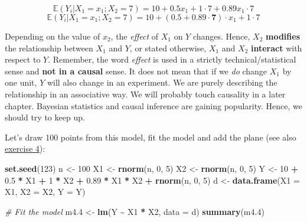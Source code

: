 \documentclass[
]{book}
\newenvironment{Shaded}{\begin{snugshade}}{\end{snugshade}}
\newcommand{\AttributeTok}[1]{\textcolor[rgb]{0.13,0.29,0.53}{#1}}
\newcommand{\CommentTok}[1]{\textcolor[rgb]{0.56,0.35,0.01}{\textit{#1}}}
\newcommand{\DecValTok}[1]{\textcolor[rgb]{0.00,0.00,0.81}{#1}}
\newcommand{\FloatTok}[1]{\textcolor[rgb]{0.00,0.00,0.81}{#1}}
\newcommand{\FunctionTok}[1]{\textcolor[rgb]{0.13,0.29,0.53}{\textbf{#1}}}
\newcommand{\NormalTok}[1]{#1}
\newcommand{\OtherTok}[1]{\textcolor[rgb]{0.56,0.35,0.01}{#1}}
\newcommand{\SpecialCharTok}[1]{\textcolor[rgb]{0.81,0.36,0.00}{\textbf{#1}}}
\begin{document}
\[ \mathbb{E}(Y_i|X_1 = x_1; X_2 = 7) = 10 + 0.5 x_1 + 1 \cdot 7 + 0.89 x_1 \cdot 7\]
\[ \mathbb{E}(Y_i|X_1 = x_1; X_2 = 7) = 10 + (0.5 + 0.89 \cdot \mathbf{7}) \cdot x_1 + 1 \cdot 7\]

Depending on the value of \(x_2\), the \emph{effect} of \(X_1\) on \(Y\) changes.
Hence, \(X_2\) \textbf{modifies} the relationship between \(X_1\) and \(Y\), or stated otherwise,
\(X_1\) and \(X_2\) \textbf{interact} with respect to \(Y\). Remember, the word \emph{effect} is
used in a strictly technical/statistical sense and \textbf{not in a causal} sense.
It does not mean that if we \emph{do} change \(X_1\) by one unit,
\(Y\) will also change in an experiment. We are purely describing the relationship
in an associative way. We will probably touch causality in a later chapter.
Bayesian statistics and causal inference are gaining popularity. Hence, we should try to keep up.

Let's draw 100 points from this model, fit the model and add the plane (see also \hyperref[exercise3_multiple_regression]{exercise 4}):

\begin{Shaded}
\begin{Highlighting}[]
\FunctionTok{set.seed}\NormalTok{(}\DecValTok{123}\NormalTok{)}
\NormalTok{n }\OtherTok{\textless{}{-}} \DecValTok{100}
\NormalTok{X1 }\OtherTok{\textless{}{-}} \FunctionTok{rnorm}\NormalTok{(n, }\DecValTok{0}\NormalTok{, }\DecValTok{5}\NormalTok{)}
\NormalTok{X2 }\OtherTok{\textless{}{-}} \FunctionTok{rnorm}\NormalTok{(n, }\DecValTok{0}\NormalTok{, }\DecValTok{5}\NormalTok{)}
\NormalTok{Y }\OtherTok{\textless{}{-}} \DecValTok{10} \SpecialCharTok{+} \FloatTok{0.5} \SpecialCharTok{*}\NormalTok{ X1 }\SpecialCharTok{+} \DecValTok{1} \SpecialCharTok{*}\NormalTok{ X2 }\SpecialCharTok{+} \FloatTok{0.89} \SpecialCharTok{*}\NormalTok{ X1 }\SpecialCharTok{*}\NormalTok{ X2 }\SpecialCharTok{+} \FunctionTok{rnorm}\NormalTok{(n, }\DecValTok{0}\NormalTok{, }\DecValTok{5}\NormalTok{)}
\NormalTok{d }\OtherTok{\textless{}{-}} \FunctionTok{data.frame}\NormalTok{(}\AttributeTok{X1 =}\NormalTok{ X1, }\AttributeTok{X2 =}\NormalTok{ X2, }\AttributeTok{Y =}\NormalTok{ Y)}

\CommentTok{\# Fit the model}
\NormalTok{m4}\FloatTok{.4} \OtherTok{\textless{}{-}} \FunctionTok{lm}\NormalTok{(Y }\SpecialCharTok{\textasciitilde{}}\NormalTok{ X1 }\SpecialCharTok{*}\NormalTok{ X2, }\AttributeTok{data =}\NormalTok{ d)}
\FunctionTok{summary}\NormalTok{(m4}\FloatTok{.4}\NormalTok{)}
\end{Highlighting}
\end{Shaded}
\end{document}
